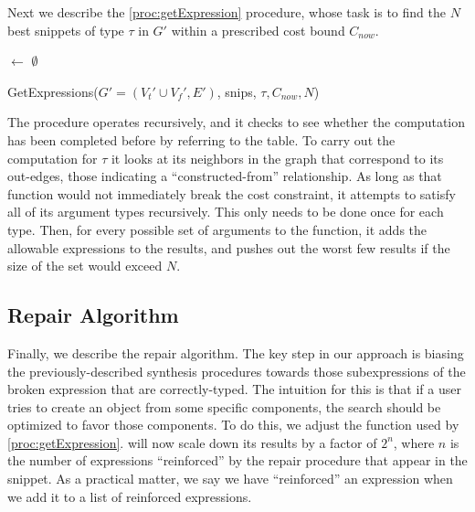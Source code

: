 Next we describe the \ref{proc:getExpression} procedure, whose task is
to find the $N$ best snippets of type $\tau$ in $G'$ within a
prescribed cost bound $C_{now}$.
\begin{procedure}
\lIf{$\tau$ $\in$ \Keys{\Snips}}{\Return{\Snips$[\tau]$}}
\Results $\leftarrow$ $\emptyset$ \;
\Return{\Results}
\caption{GetExpressions({$G'=(V_t' \cup V_f', E')$}, snips, $\tau, C_{now}, N$)}\label{proc:getExpression}
\end{procedure}
The procedure operates recursively, and it checks to see whether the
computation has been completed before by referring to the \Snips
table. To carry out the computation for $\tau$ it looks at its
neighbors in the graph that correspond to its out-edges, those
indicating a ``constructed-from'' relationship. As long as that
function would not immediately break the cost constraint, it attempts
to satisfy all of its argument types recursively. This only needs to
be done once for each type. Then, for every possible set of arguments
to the function, it adds the allowable expressions to the results, and
pushes out the worst few results if the size of the set would exceed
$N$.

\subsection{Repair Algorithm}
\label{sec:algorithm:repair}
Finally, we describe the repair algorithm. The key step in our
approach is biasing the previously-described synthesis procedures
towards those subexpressions of the broken expression that are
correctly-typed. The intuition for this is that if a user tries to
create an object from some specific components, the search should be
optimized to favor those components. To do this, we adjust the \Cost
function used by \ref{proc:getExpression}. \Cost will now scale down
its results by a factor of $2^n$, where $n$ is the number of
expressions ``reinforced'' by the repair procedure that appear in the
snippet. As a practical matter, we say we have ``reinforced'' an
expression when we add it to a list of reinforced expressions.

